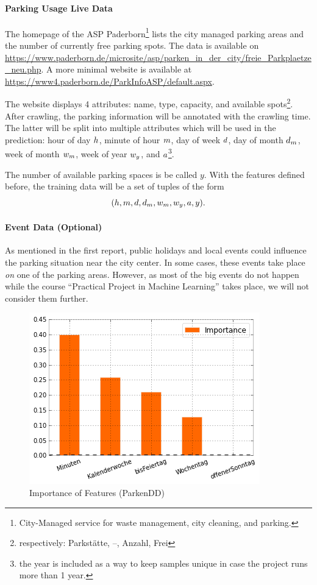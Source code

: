 \paragraph{Parking Usage Live Data}
The homepage of the ASP Paderborn\footnote{City-Managed service for waste management, city cleaning, and parking.} lists the city managed parking areas and the number of currently free parking spots. 
The data is available on \url{https://www.paderborn.de/microsite/asp/parken_in_der_city/freie_Parkplaetze_neu.php}. A more minimal website is available at \url{https://www4.paderborn.de/ParkInfoASP/default.aspx}. 

The website displays 4 attributes: name, type, capacity, and available spots\footnote{respectively: Parkstätte, --, Anzahl, Frei}. After crawling, the parking information will be annotated with the crawling time. The latter will be split into multiple attributes which will be used in the prediction: hour of day \(h\), minute of hour \(m\), day of week \(d\), day of month \(d_m\), week of month \(w_m\), week of year \(w_y\), and \(a\)\footnote{the year is included as a way to keep samples unique in case the project runs more than 1 year.}.

The number of available parking spaces is be called \(y\). With the features defined before, the training data will be a set of tuples of the form  
\[
(h, m, d, d_m, w_m, w_y, a, y)\text{.}
\]

\paragraph{Event Data (Optional)}
As mentioned in the first report, public holidays and local events could influence the parking situation near the city center. In some cases, these events take place \textit{on} one of the parking areas. However, as most of the big events do not happen while the course ``Practical Project in Machine Learning'' takes place, we will not consider them further.

\begin{figure}
  \centering
  \includegraphics[scale=0.5]{parkendd-Feature-Importance.png}
  \caption{Importance of Features (ParkenDD)}
  \label{fig:parkendd_features}
\end{figure}

